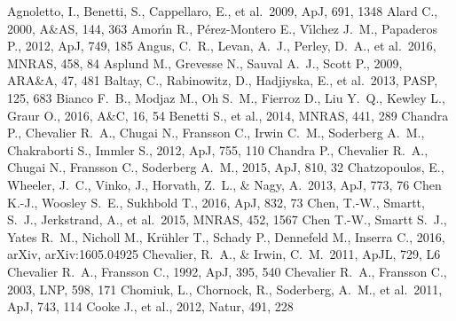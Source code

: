 \documentclass[useAMS,usenatbib]{mn2e}
\begin{document}
\begin{thebibliography}{99}\label{bib}
 Agnoletto, I., 
Benetti, S., Cappellaro, E., et al.\ 2009, ApJ, 691, 1348 
 Alard C., 2000, A\&AS, 144, 363 
 Amor{\'{\i}}n R., P{\'e}rez-Montero E., V{\'{\i}}lchez J.~M., Papaderos P., 2012, ApJ, 749, 185 
 Angus, C.~R., Levan, A.~J., Perley, D.~A., et al.\ 2016, MNRAS, 458, 84 
 Asplund M., Grevesse N., Sauval A.~J., Scott P., 2009, ARA\&A, 47, 481 
 Baltay, C., Rabinowitz, D., Hadjiyska, E., et al.\ 2013, PASP, 125, 683 
 Bianco F.~B., Modjaz M., Oh S.~M., Fierroz D., Liu Y.~Q., Kewley L., Graur O., 2016, A\&C, 16, 54 
 Benetti S., et al., 2014, MNRAS, 441, 289 
 Chandra P., Chevalier R.~A., Chugai N., Fransson C., Irwin C.~M., Soderberg A.~M., Chakraborti S., Immler S., 2012, ApJ, 755, 110 
 Chandra P., Chevalier R.~A., Chugai N., Fransson C., Soderberg A.~M., 2015, ApJ, 810, 32 
 Chatzopoulos, E., 
Wheeler, J.~C., Vinko, J., Horvath, Z.~L., \& Nagy, A.\ 2013, ApJ, 773, 76 
 Chen K.-J., Woosley S.~E., Sukhbold T., 2016, ApJ, 832, 73 
 Chen, T.-W., Smartt, 
S.~J., Jerkstrand, A., et al.\ 2015, MNRAS, 452, 1567 
 Chen T.-W., Smartt S.~J., Yates R.~M., Nicholl M., Kr{\"u}hler T., Schady P., Dennefeld M., Inserra C., 2016, arXiv, arXiv:1605.04925 
 Chevalier, R.~A., \& Irwin, C.~M.\ 2011, ApJL, 729, L6 
 Chevalier R.~A., Fransson C., 1992, ApJ, 395, 540
 Chevalier R.~A., Fransson C., 2003, LNP, 598, 171 
 Chomiuk, L., Chornock, 
R., Soderberg, A.~M., et al.\ 2011, ApJ, 743, 114 
 Cooke J., et al., 2012, Natur, 491, 228 

\end{thebibliography}
\end{document}
